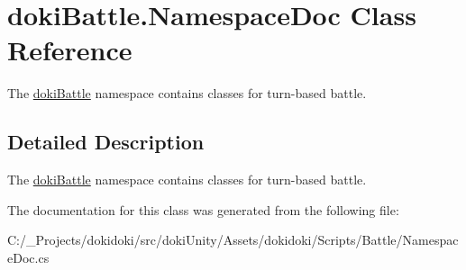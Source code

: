 \hypertarget{classdoki_battle_1_1_namespace_doc}{}\section{doki\+Battle.\+Namespace\+Doc Class Reference}
\label{classdoki_battle_1_1_namespace_doc}


The \hyperlink{namespacedoki_battle}{doki\+Battle} namespace contains classes for turn-\/based battle.  




\subsection{Detailed Description}
The \hyperlink{namespacedoki_battle}{doki\+Battle} namespace contains classes for turn-\/based battle. 



The documentation for this class was generated from the following file\+:\begin{DoxyCompactItemize}
\item 
C\+:/\+\_\+\+Projects/dokidoki/src/doki\+Unity/\+Assets/dokidoki/\+Scripts/\+Battle/Namespace\+Doc.\+cs\end{DoxyCompactItemize}
